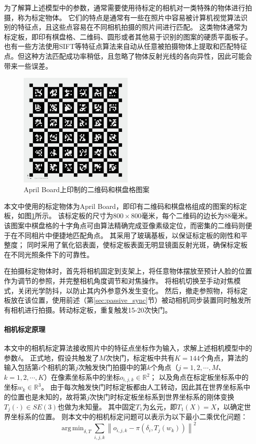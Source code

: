 \documentclass{scutmaster}
\DeclareMathOperator*{\argmin}{arg\,min}
\begin{document}
为了解算上述模型中的参数，通常需要使用待标定的相机对一类特殊的物体进行拍摄，称为标定物体。
它们的特点是通常有一些在照片中容易被计算机视觉算法识别的特征点，且这些点容易在不同相机拍摄的照片间进行匹配。
这类物体通常为标定板，即印有棋盘格、二维码、圆形或者其他易于识别的图案的硬质平面板子。
也有一些方法\cite{colmap}使用SIFT等特征点算法来自动从任意被拍摄物体上提取和匹配特征点。但这种方法匹配成功率稍低，且忽略了物体反射光线的各向异性，因此可能会带来一些误差。

\begin{figure}
    \centering
    \includegraphics[width=0.5\textwidth]{figures/april_board}
    \caption{April Board上印制的二维码和棋盘格图案}
    \label{fig:april_board}
\end{figure}

本文中使用的标定物体为April Board，即印有二维码和棋盘格组成的图案的标定板，如图\ref{fig:april_board}所示。
该标定板的尺寸为$800 \times 800$毫米，每个二维码的边长为$88$毫米。
该图案中棋盘格的十字角点可由算法精确完成亚像素级定位，而密集的二维码则便于在不同相片中便捷地匹配角点。
其采用了玻璃基板，以保证标定板的刚性和平整度；
同时采用了氧化铝表面，使标定板表面无明显镜面反射光斑，确保标定板在不同光照条件下的可靠性。

在拍摄标定物体时，首先将相机固定到支架上，将任意物体摆放至预计人脸的位置作为调节的参照，并完整相机角度调节和对焦操作。
将相机切换至手动对焦模式，关闭光学防抖，以防止其内外参意外发生变化。
然后，撤走参照物，将标定板放在该位置，使用前述（第\ref{sec:passive_sync}节）被动相机同步装置同时触发所有相机进行拍摄。转动标定板，重复触发15-20次快门。

\paragraph{相机标定原理}本文中的相机标定算法接收照片中的特征点坐标作为输入，求解上述相机模型中的参数$\delta$。
正式地，假设共触发了$M$次快门，标定板中共有$K=144$个角点，算法的输入包括第$i$个相机的第$j$次触发快门拍摄中的第$k$个角点（$j = 1,2,\cdots,M$、$k = 1,2,\cdots,K$）在像素坐标系中的坐标$o_{i,j,k}\in \mathbb{R}^2$；
以及角点在标定板坐标系中的坐标$w_k\in \mathbb{R}^3$。
由于每次触发快门时标定板都由人工转动，因此其在世界坐标系中的位置也是未知的，故将第$j$次快门时标定板坐标系到世界坐标系的刚体变换$T_{j}(\cdot)\in SE(3)$也做为未知量。
其中固定$T_{1}$为幺元，即$T_{1}(X) = X$，以确定世界坐标系的位置。
则本文中的相机标定问题可以表示为以下最小二乘优化问题：
\begin{equation}
    \label{eq:calib_opt}
    \argmin_{\delta,T} \sum_{i,j,k} \left\| o_{i,j,k} - \pi\left(\delta_i, T_j(w_k)\right) \right\|^2
\end{equation}
\end{document}
